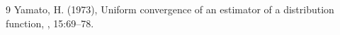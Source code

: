 \documentclass[twoside]{article}
\begin{document}
\begin{thebibliography}{9}
Yamato, H. (1973),
\newblock Uniform convergence of an estimator of a distribution function,
, 15:69--78.
%
%
%


%
\end{thebibliography}
 
\end{document}
